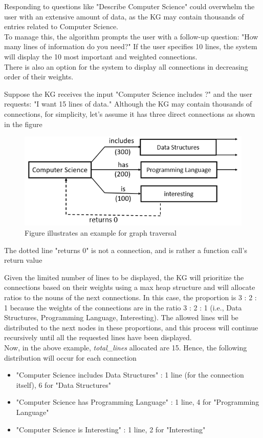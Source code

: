 \documentclass[conference]{IEEEtran}
\begin{document}
Responding to questions like "Describe Computer Science" could overwhelm the user with an extensive amount of data, as the KG may contain thousands of entries related to Computer Science. \\
To manage this, the algorithm prompts the user with a follow-up question: "How many lines of information do you need?" If the user specifies 10 lines, the system will display the 10 most important and weighted connections. 
\\
There is also an option for the system to display all connections in decreasing order of their weights.


Suppose the KG receives the input "Computer Science includes ?" and the user requests: "I want 15 lines of data."
Although the KG may contain thousands of connections, for simplicity, let's assume it has three direct connections as shown in the figure

\begin{figure}[htbp]
\centering
\includegraphics[width=0.8\linewidth]{kg_explanation_example.png}
\caption{Figure illustrates an example for graph traversal}
\label{fig}
\end{figure}

The dotted line "returns 0" is not a connection, and is rather a function call's return value



Given the limited number of lines to be displayed, the KG will prioritize the connections based on their weights using a max heap structure and will allocate ratios to the nouns of the next connections. In this case, the proportion is 3 : 2 : 1 
because the weights of the connections are in the ratio 3 : 2 : 1 (i.e., Data Structures, Programming Language, Interesting). The allowed lines will be distributed to the next nodes in these proportions, and this process will continue recursively until all the requested lines have been displayed.\\


Now, in the above example, \textit{total\_lines} allocated are 15. Hence, the following distribution will occur for each connection
\begin{itemize}
\item "Computer Science includes Data Structures" : 1 line (for the connection itself), 6 for "Data Structures"
\item "Computer Science has Programming Language" : 1 line, 4 for "Programming Language"
\item "Computer Science is Interesting" : 1 line, 2 for "Interesting"
\end{itemize}
\end{document}
